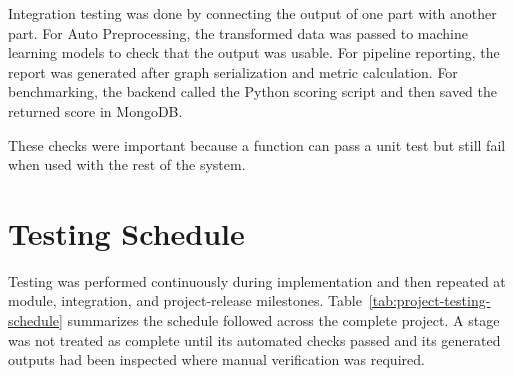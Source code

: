 \documentclass[12pt,a4paper]{report}
\begin{document}
Integration testing was done by connecting the output of one part with another
part. For Auto Preprocessing, the transformed data was passed to machine
learning models to check that the output was usable. For pipeline reporting,
the report was generated after graph serialization and metric calculation. For
benchmarking, the backend called the Python scoring script and then saved the
returned score in MongoDB.

These checks were important because a function can pass a unit test but still
fail when used with the rest of the system.

\section{Testing Schedule}

Testing was performed continuously during implementation and then repeated at
module, integration, and project-release milestones. Table~\ref{tab:project-testing-schedule}
summarizes the schedule followed across the complete project. A stage was not
treated as complete until its automated checks passed and its generated outputs
had been inspected where manual verification was required.
\end{document}

